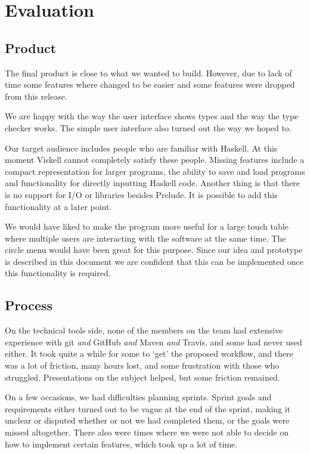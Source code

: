 \chapter{Evaluation}
\label{chap:Evaluation}

\section{Product}

The final product is close to what we wanted to build. However, due to lack of time some features where changed to be easier and some features were dropped from this release.

We are happy with the way the user interface shows types and the way the type checker works. The simple user interface also turned out the way we hoped to.

Our target audience includes people who are familiar with Haskell. At this moment Viskell cannot completely satisfy these people. Missing features include a compact representation for larger programs, the ability to save and load programs and functionality for directly inputting Haskell code. Another thing is that there is no support for I/O or libraries besides Prelude. It is possible to add this functionality at a later point.

We would have liked to make the program more useful for a large touch table where multiple users are interacting with the software at the same time. The circle menu would have been great for this purpose. Since our idea and prototype is described in this document we are confident that this can be implemented once this functionality is required.

\section{Process}

On the technical tools side, none of the members on the team had extensive experience with git \emph{and} GitHub \emph{and} Maven \emph{and} Travis, and some had never used either. It took quite a while for some to `get' the proposed workflow, and there was a lot of friction, many hours lost, and some frustration with those who struggled. Presentations on the subject helped, but some friction remained.

On a few occasions, we had difficulties planning sprints. Sprint goals and requirements either turned out to be vague at the end of the sprint, making it unclear or disputed whether or not we had completed them, or the goals were missed altogether. There also were times where we were not able to decide on how to implement certain features, which took up a lot of time.

